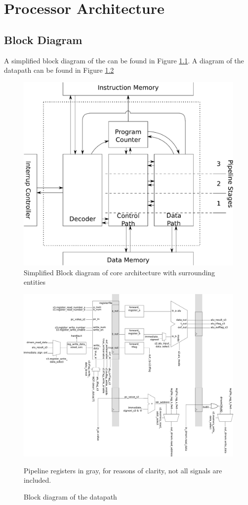 \chapter{Processor Architecture}
\section{Block Diagram}
A simplified block diagram of the \procname can be found in Figure \ref{fig:blockdiagram_core}.
A diagram of the datapath can be found in Figure \ref{fig:blockdiagram_dp}

\begin{figure}[htb]
	\centering
	\includegraphics[scale=0.5]{./figures/block_core.pdf}
	\caption{Simplified Block diagram of core architecture with surrounding entities}
	\label{fig:blockdiagram_core}
\end{figure}
\begin{figure}
	\centering
	\includegraphics[scale=0.6]{./figures/block_dp.pdf}
	\caption{Block diagram of the datapath}
	\label{fig:blockdiagram_dp}
	Pipeline registers in gray, for reasons of clarity, not all signals are included.
\end{figure}

